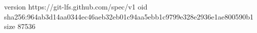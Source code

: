 version https://git-lfs.github.com/spec/v1
oid sha256:964ab3d14aa0344ec46aeb32eb01c94aa5ebb1c9799e328e2936e1ae800590b1
size 87536
